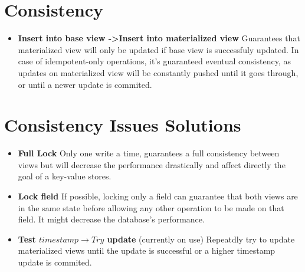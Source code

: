 \documentclass[preprint,12pt]{elsarticle}
\begin{document}
\section{Consistency}
\begin{itemize}
\item{\bf Insert into base view -\textgreater Insert into materialized view}
\subitem Guarantees that materialized view will only be updated if base view is successfuly updated. In case of idempotent-only operations, it's guaranteed eventual consistency, as updates on materialized view will be constantly pushed until it goes through, or until a newer update is commited.
\end{itemize}

\section{Consistency Issues Solutions}
\begin{itemize}
\item{\bf Full Lock}
\subitem Only one write a time, guarantees a full consistency between views but will decrease the performance drastically and affect directly the goal of a key-value stores. 
\item{\bf Lock field}
\subitem If possible, locking only a field can guarantee that both views are in the same state before allowing any other operation to be made on that field. It might decrease the database's performance.
\item{\bf Test $timestamp \rightarrow Try$ update} (currently on use)
\subitem Repeatdly try to update materialized views until the update is successful or a higher timestamp update is commited.
\end{itemize}













\end{document}
